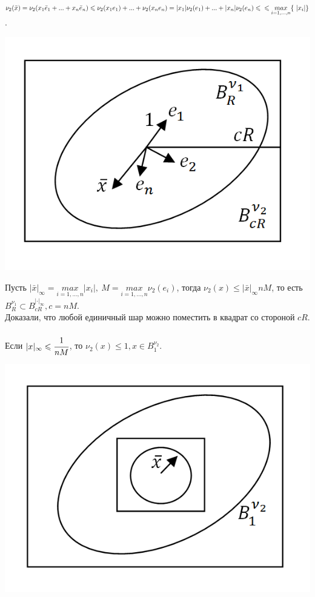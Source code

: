 \documentclass[a4paper,12pt]{article}
\begin{document}
\begin{defintion}
$\nu_2(\bar x) = \nu_2 (x_1 \bar e_1 +...+x_n \bar e_n) \leqslant \nu_2(x_1e_1)+...+\nu_2(x_ne_n) = |x_1|\nu_2(e_1)+...+|x_n|\nu_2(e_n) \leqslant \\ \leqslant \underset{i=1,...,n}{max} \{\ |x_i|\}$.\begin{center}
	\includegraphics[scale=0.5]{l5_5.png}\end{center}
Пусть $|\bar x|_{\infty} = \underset{i=1,...,n}{max}|x_i|, ~M = \underset{i=1,...,n}{max}\nu_2(e_i)$, тогда $\nu_2(x) \leqslant |\bar x|_{\infty}nM$, то есть $B_R^{\nu_1} \subset B_{cR}^{|\cdot |_{\infty}}, c = nM$.\\
Доказали, что любой единичный шар можно поместить в квадрат со стороной $cR$.\\
\\
Если $|x|_{\infty} \leqslant \cfrac{1}{nM}$, то $\nu_2(x) \leqslant 1, x \in B_1^{\nu_2}$.\begin{center} \includegraphics[scale=0.5]{l5_6.png}\end{center}

\end{defintion}
\end{document}
